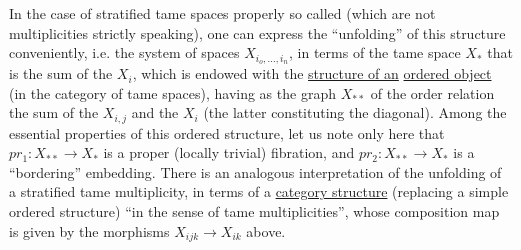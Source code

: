 
In the case of stratified tame spaces properly so called (which
are not multiplicities strictly speaking), one can express
the ``unfolding'' of this structure conveniently, i.e.
the system of spaces $X_{i_o,\ldots,i_n}$, in terms of the tame
space $X_*$ that is the sum of the $X_i$, which is endowed with the \uline{structure of an}
\uline{ordered object} (in the category of tame spaces), having as the graph
$X_{**}$ of the order relation the sum of the $X_{i,j}$ and the $X_i$
(the latter constituting the diagonal). Among the essential
properties of this ordered structure, let us note only
here that $pr_1 : X_{**} \longrightarrow X_*$ is a proper (locally trivial)
fibration, and $pr_2 : X_{**} \longrightarrow X_*$ is a ``bordering'' embedding.
There is an analogous interpretation of the unfolding of a stratified
tame multiplicity, in terms of a \uline{category structure}
(replacing a simple ordered structure) ``in the sense of tame
multiplicities'', whose composition map is given
by the morphisms $X_{ijk} \longrightarrow X_{ik}$ above.

